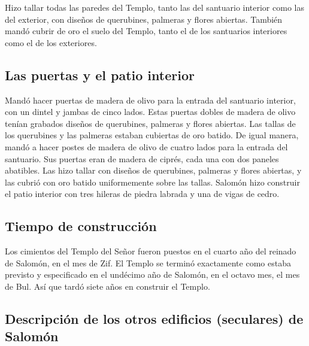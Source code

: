  Hizo tallar todas las paredes del Templo, tanto las del
santuario interior como las del exterior, con diseños de querubines,
palmeras y flores abiertas.  También mandó cubrir de oro
el suelo del Templo, tanto el de los santuarios interiores como el de
los exteriores.

\hypertarget{las-puertas-y-el-patio-interior}{%
\subsection{Las puertas y el patio
interior}\label{las-puertas-y-el-patio-interior}}

 Mandó hacer puertas de madera de olivo para la entrada
del santuario interior, con un dintel y jambas de cinco lados.
 Estas puertas dobles de madera de olivo tenían grabados
diseños de querubines, palmeras y flores abiertas. Las tallas de los
querubines y las palmeras estaban cubiertas de oro batido.
 De igual manera, mandó a hacer postes de madera de olivo
de cuatro lados para la entrada del santuario.  Sus
puertas eran de madera de ciprés, cada una con dos paneles abatibles.
 Las hizo tallar con diseños de querubines, palmeras y
flores abiertas, y las cubrió con oro batido uniformemente sobre las
tallas.  Salomón hizo construir el patio interior con
tres hileras de piedra labrada y una de vigas de cedro.

\hypertarget{tiempo-de-construcciuxf3n}{%
\subsection{Tiempo de construcción}\label{tiempo-de-construcciuxf3n}}

 Los cimientos del Templo del Señor fueron puestos en el
cuarto año del reinado de Salomón, en el mes de Zif.  El
Templo se terminó exactamente como estaba previsto y especificado en el
undécimo año de Salomón, en el octavo mes, el mes de Bul. Así que tardó
siete años en construir el Templo.

\hypertarget{descripciuxf3n-de-los-otros-edificios-seculares-de-salomuxf3n}{%
\subsection{Descripción de los otros edificios (seculares) de
Salomón}\label{descripciuxf3n-de-los-otros-edificios-seculares-de-salomuxf3n}}


